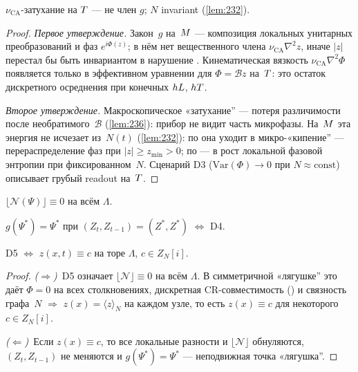 \begin{proposition}
\label{prop:237}
$\nu_{\mathrm{CA}}$-затухание на $T$ --- не член $g$; $N$ invariant (\cref{lem:232}).
\end{proposition}

\begin{proof}
\emph{Первое утверждение.}
Закон~$g$ на~$M$ --- композиция локальных унитарных преобразований
и фаз $e^{i\Phi(z)}$; в нём нет вещественного члена $\nu_{\mathrm{CA}}\nabla^2 z$,
 иначе $|z|$ перестал бы быть инвариантом в нарушение .
Кинематическая вязкость $\nu_{\mathrm{CA}}\nabla^2\Phi$ появляется только в эффективном
уравнении для $\Phi=\mathcal{B}z$ на~$T$:
это остаток дискретного осреднения при конечных $hL$, $hT$.

\smallskip
\emph{Второе утверждение.}
Макроскопическое «затухание'' --- потеря различимости после необратимого~$\mathcal{B}$
(\cref{lem:236}): прибор не видит часть микрофазы.
На~$M$ эта энергия не исчезает из~$N(t)$ (\cref{lem:232}):
по  она уходит в микро-«кипение'' --- перераспределение фаз
при $|z|\ge z_{\min}>0$; по  --- в рост локальной фазовой энтропии
при фиксированном~$N$.
Сценарий D3 ($\mathrm{Var}(\Phi)\to 0$ при $N\approx\mathrm{const}$) описывает
грубый readout на~$T$.
\end{proof}

\begin{definition}
$\lfloor\mathcal{N}(\Psi)\rfloor\equiv 0$ на всём $\Lambda$.
\end{definition}

\begin{definition}
$g(\Psi^*)=\Psi^*$ при $(Z_t,Z_{t-1})=(Z^*,Z^*)$ $\Leftrightarrow$ D4.
\end{definition}

\begin{lemma}[Классификация D5]
\label{lem:238a}
D5 $\Leftrightarrow$ $z(x,t)\equiv c$ на торе $\Lambda$, $c\in Z_N[i]$.
\end{lemma}

\begin{proof}
\emph{($\Rightarrow$)}~D5 означает $\lfloor\mathcal{N}\rfloor\equiv 0$ на всём $\Lambda$.
В симметричной «лягушке'' это даёт $\Phi=0$ на всех столкновениях,
дискретная CR-совместимость () и связность графа~$N$ $\Rightarrow$
$z(x)=\langle z\rangle_N$ на каждом узле, то есть $z(x)\equiv c$ для некоторого $c\in Z_N[i]$.

\smallskip
\emph{($\Leftarrow$)}~Если $z(x)\equiv c$, то все локальные разности и $\lfloor\mathcal{N}\rfloor$ обнуляются,
$(Z_t,Z_{t-1})$ не меняются и $g(\Psi^*)=\Psi^*$ --- неподвижная точка «лягушка''.
\end{proof}

